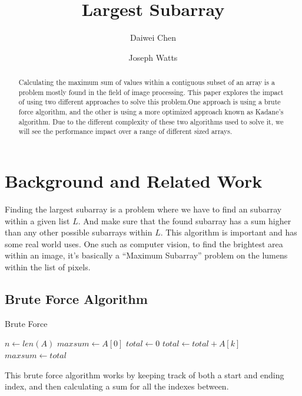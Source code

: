 \documentclass[10pt, letterpaper]{article}
\title{Largest Subarray}
\author{Daiwei Chen \and Joseph Watts}
\begin{document}
	\maketitle
	\begin{abstract}
		Calculating the maximum sum of values within a contiguous subset of an array is a problem mostly found in the field of image processing.
		This paper explores the impact of using two different approaches to solve this problem.One approach is using a brute force algorithm, and the other is using a more optimized approach known as Kadane's algorithm.
		Due to the different complexity of these two algorithms used to solve it,
		we will see the performance impact over a range of different sized arrays.
	\end{abstract}
	\section{Background and Related Work}
  Finding the largest subarray is a problem where we have to find an subarray within a given list $L$. And make sure that the found subarray has a sum higher than any other possible subarrays within $L$.
  This algorithm is important and has some real world uses. One such as computer vision, to find the brightest area within an image, it's basically a ``Maximum Subarray'' problem on the lumens within the list of pixels.

	\subsection{Brute Force Algorithm}

	\begin{algorithm}
	\begin{algorithmic}
		\caption{Brute Force}\label{bruteforce}
	\State $n\gets len(A)$
	\State $maxsum\gets A[0]$
	\State $total\gets 0$
	\State $total\gets total + A[k]$
	\EndFor
	\State $maxsum\gets total$
	\EndIf
	\EndFor
	\EndFor
	\EndFunction
	\end{algorithmic}
	\end{algorithm}


	This brute force algorithm works by keeping track of both a start and ending index, and then calculating a sum for all the indexes between.
\end{document}
